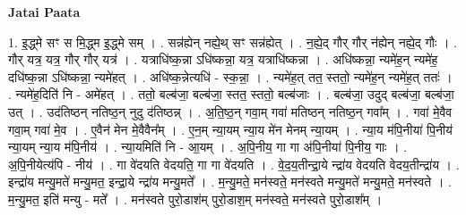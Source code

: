 \documentclass[17pt]{extarticle}
\begin{document}
\textbf{Jatai Paata} \newline

1. इ॒द्ध्मे सꣳ स मि॒द्ध्म इ॒द्ध्मे सम् । . सन्न॑ह्येन् नह्ये॒थ् सꣳ सन्न॑ह्येत् । . न॒ह्ये॒द् गौर् गौर् न॑ह्येन् नह्ये॒द् गौः । . गौर् यत्र॒ यत्र॒ गौर् गौर् यत्र॑ । . यत्राधि॑ष्क॒न्ना ऽधि॑ष्कन्ना॒ यत्र॒ यत्राधि॑ष्कन्ना । . अधि॑ष्कन्ना॒ न्यमे॑ह॒न् न्यमे॑ह॒ दधि॑ष्क॒न्ना ऽधि॑ष्कन्ना॒ न्यमे॑हत् । . अधि॑ष्क॒न्नेत्यधि॑ - स्क॒न्ना॒ । . न्यमे॑ह॒त् तत॒ स्ततो॒ न्यमे॑ह॒न् न्यमे॑ह॒त् ततः॑ । . न्यमे॑ह॒दिति॑ नि - अमे॑हत् । . ततो॒ बल्ब॑जा॒ बल्ब॑जा॒ स्तत॒ स्ततो॒ बल्ब॑जाः । . बल्ब॑जा॒ उदुद् बल्ब॑जा॒ बल्ब॑जा॒ उत् । . उद॑तिष्ठन् नतिष्ठ॒न् नुदु द॑तिष्ठन्न् । . अ॒ति॒ष्ठ॒न् गवा॒म् गवा॑ मतिष्ठन् नतिष्ठ॒न् गवा᳚म् । . गवा॑ मे॒वैव गवा॒म् गवा॑ मे॒व । . ए॒वैन॑ मेन मे॒वैवैन᳚म् । . ए॒न॒म् न्या॒यम् न्या॒य मे॑न मेनम् न्या॒यम् । . न्या॒य म॑पि॒नीया॑ पि॒नीय॑ न्या॒यम् न्या॒य म॑पि॒नीय॑ । . न्या॒यमिति॑ नि - आ॒यम् । . अ॒पि॒नीय॒ गा गा अ॑पि॒नीया॑ पि॒नीय॒ गाः । . अ॒पि॒नीयेत्य॑पि - नीय॑ । . गा वे॑दयति वेदयति॒ गा गा वे॑दयति । . वे॒द॒य॒तीन्द्रा॒ये न्द्रा॑य वेदयति वेदय॒तीन्द्रा॑य । . इन्द्रा॑य मन्यु॒मते॑ मन्यु॒मत॒ इन्द्रा॒ये न्द्रा॑य मन्यु॒मते᳚ । . म॒न्यु॒मते॒ मन॑स्वते॒ मन॑स्वते मन्यु॒मते॑ मन्यु॒मते॒ मन॑स्वते । . म॒न्यु॒मत॒ इति॑ मन्यु - मते᳚ । . मन॑स्वते पुरो॒डाश॑म् पुरो॒डाश॒म् मन॑स्वते॒ मन॑स्वते पुरो॒डाश᳚म् । \newline
\end{document}
